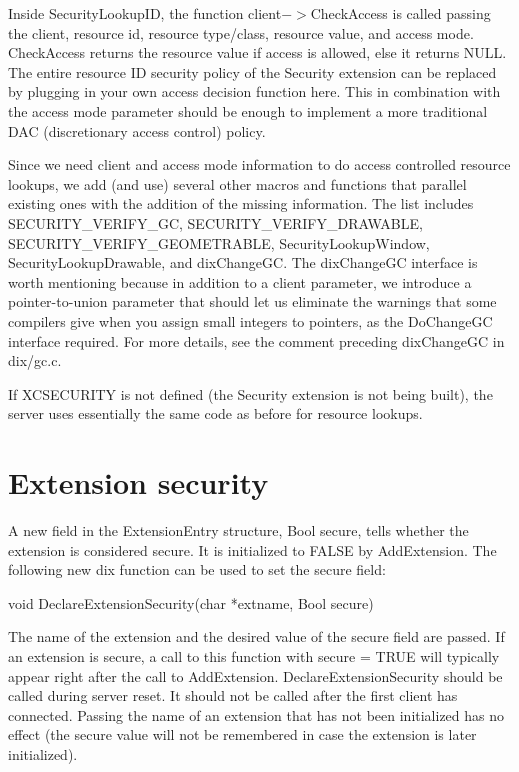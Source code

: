 \documentclass{article}
\begin{document}
Inside SecurityLookupID, the function client$->$CheckAccess is called
passing the client, resource id, resource type/class, resource value,
and access mode.  CheckAccess returns the resource value if access is
allowed, else it returns NULL.  The entire resource ID security policy
of the Security extension can be replaced by plugging in your own
access decision function here.  This in combination with the access
mode parameter should be enough to implement a more traditional DAC
(discretionary access control) policy.

Since we need client and access mode information to do access
controlled resource lookups, we add (and use) several other macros and
functions that parallel existing ones with the addition of the missing
information.  The list includes SECURITY\_VERIFY\_GC,
SECURITY\_VERIFY\_DRAWABLE, SECURITY\_VERIFY\_GEOMETRABLE,
SecurityLookupWindow, SecurityLookupDrawable, and dixChangeGC.  The
dixChangeGC interface is worth mentioning because in addition to a
client parameter, we introduce a pointer-to-union parameter that
should let us eliminate the warnings that some compilers give when you
assign small integers to pointers, as the DoChangeGC interface
required.  For more details, see the comment preceding dixChangeGC in
dix/gc.c.

If XCSECURITY is not defined (the Security extension is not being
built), the server uses essentially the same code as before for
resource lookups.

\section{Extension security}

A new field in the ExtensionEntry structure, Bool secure, tells
whether the extension is considered secure.  It is initialized to
FALSE by AddExtension.  The following new dix function can be used to
set the secure field:

void DeclareExtensionSecurity(char *extname, Bool secure)

The name of the extension and the desired value of the secure field
are passed.  If an extension is secure, a call to this function with
secure = TRUE will typically appear right after the call to
AddExtension.  DeclareExtensionSecurity should be called during server
reset.  It should not be called after the first client has connected.
Passing the name of an extension that has not been initialized has no
effect (the secure value will not be remembered in case the extension
is later initialized).
\end{document}
